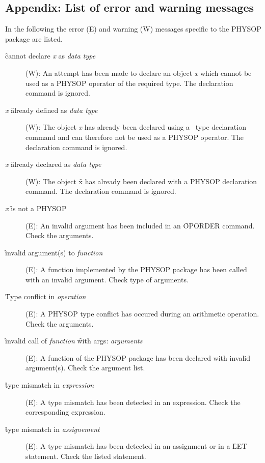 \subsection{Appendix: List of error and warning messages}
In the following the error (E) and warning (W) messages specific to the
PHYSOP package are listed.
\begin{description}
\item[\f{cannot declare} \textit{x}\f{ as }\textit{data type}] (W):
 An attempt has been made to declare an
object \textit{x} which cannot be used as a PHYSOP operator of the
required type. The declaration command is ignored.

\item [\textit{x} \f{already defined as} \textit{data type}] (W): The object
\textit{x} has already been declared using a \REDUCE\ type declaration
command and can therefore not be used as a PHYSOP operator.
The declaration command is ignored.

\item [\textit{x} \f{already declared as} \textit{data type}] (W): The object
\f{x} has already been declared with a PHYSOP declaration command.
The declaration command is ignored.

\item[\textit{x} \f{is not a PHYSOP}] (E): An invalid argument has been
included in an \f{OPORDER} command. Check the arguments.

\item[\f{invalid argument(s) to }\textit{function}] (E): A
function implemented by the PHYSOP package has been called with an
invalid argument. Check type of arguments.


\item[\f{Type conflict in }\textit{operation}] (E): A PHYSOP type conflict
has occured during an arithmetic operation. Check the arguments.

\item [\f{invalid call of }\textit{function} \f{with args:} \textit{arguments}]
(E): A function
of the PHYSOP package has been declared with invalid argument(s). Check
the argument list.

\item[\f{type mismatch in} \textit{expression}] (E): A type mismatch has
been detected in an expression.  Check the corresponding expression.

\item[\f{type mismatch in} \textit{assignement}] (E): A type
mismatch has been detected in an assignment or in a \f{LET}
statement. Check the listed statement.


\end{description}
